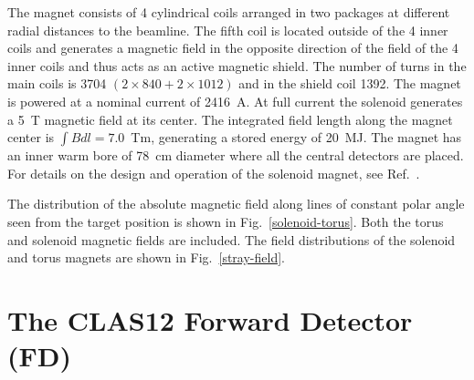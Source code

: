 \documentclass[final,3p,twocolumn]{elsarticle}
\begin{document}
The magnet consists of 4 cylindrical coils arranged in two packages at different radial distances to the beamline.
The fifth coil is located outside of the 4 inner coils and generates a magnetic field in the opposite direction of the
field of the 4 inner coils and thus acts as an active magnetic shield. The number of turns in the main coils is 3704
$(2 \times 840 + 2 \times 1012)$ and in the shield coil 1392. The magnet is powered at a nominal current of
2416~A. At full current the solenoid generates a 5~T magnetic field at its center. The integrated field length along
the magnet center is $\int Bdl = 7.0$~Tm, generating a stored energy of 20~MJ. The magnet has an inner warm bore
of 78~cm diameter where all the central detectors are placed.  For details on the design and operation of the
solenoid magnet, see Ref.~\cite{clas12-magnets}.

The distribution of the absolute magnetic field along lines of constant polar angle seen from the target position is
shown in Fig.~\ref{solenoid-torus}. Both the torus and solenoid magnetic fields are included. The field distributions 
of the solenoid and torus magnets are shown in Fig.~\ref{stray-field}.  



\section{The CLAS12 Forward Detector (FD)}
\end{document}
